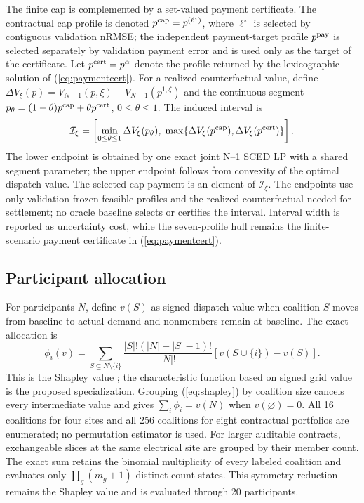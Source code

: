\documentclass[10pt,journal]{IEEEtran}
\begin{document}
 The finite cap is complemented by a set-valued payment certificate. The
 contractual cap profile is denoted $p^{\rm cap}=p^{(\ell^\star)}$, where
 $\ell^\star$ is selected by contiguous validation nRMSE; the independent
 payment-target profile $p^{\rm pay}$ is selected separately by validation
 payment error and is used only as the target of the certificate. Let
 $p^{\rm cert}=p^\alpha$ denote the profile returned by the lexicographic
 solution of (\ref{eq:paymentcert}). For a
 realized counterfactual value, define
 $\Delta V_\xi(p)=V_{N-1}(p,\xi)-V_{N-1}(p^{1,\xi})$ and the continuous
 segment $p_\theta=(1-\theta)p^{\rm cap}+\theta p^{\rm cert}$,
 $0\leq\theta\leq1$. The induced interval is
 \begin{equation}
  \mathcal I_\xi=\left[
  \min_{0\leq\theta\leq1}\Delta V_\xi(p_\theta),\;
  \max\{\Delta V_\xi(p^{\rm cap}),\Delta V_\xi(p^{\rm cert})\}\right].
  \label{eq:paymentinterval}
 \end{equation}
 The lower endpoint is obtained by one exact joint N--1 SCED LP with a shared
 segment parameter; the upper endpoint follows from convexity of the optimal
 dispatch value. The selected cap payment is an element of $\mathcal I_\xi$.
 The endpoints use only validation-frozen feasible profiles and the realized
 counterfactual needed for settlement; no oracle baseline selects or certifies
 the interval. Interval width is reported as uncertainty cost, while the
 seven-profile hull remains the finite-scenario payment certificate in
 (\ref{eq:paymentcert}).

\subsection{Participant allocation}

For participants $N$, define $v(S)$ as signed dispatch value when coalition
$S$ moves from baseline to actual demand and nonmembers remain at baseline.
The exact allocation is
\begin{equation}
 \phi_i(v)=\sum_{S\subseteq N\setminus\{i\}}
 \frac{|S|!(|N|-|S|-1)!}{|N|!}
 [v(S\cup\{i\})-v(S)].
 \label{eq:shapley}
\end{equation}
This is the Shapley value \cite{shapley1953value}; the characteristic function
based on signed grid value is the proposed specialization. Grouping
(\ref{eq:shapley}) by coalition size cancels every intermediate value and gives
$\sum_i\phi_i=v(N)$ when $v(\varnothing)=0$. All 16 coalitions for four sites
and all 256 coalitions for eight contractual portfolios are enumerated; no
permutation estimator is used. For larger auditable contracts, exchangeable
slices at the same electrical site are grouped by their member count. The exact
sum retains the binomial multiplicity of every labeled coalition and evaluates
only $\prod_g(m_g+1)$ distinct count states. This symmetry reduction remains
the Shapley value and is evaluated through 20 participants.
\end{document}
